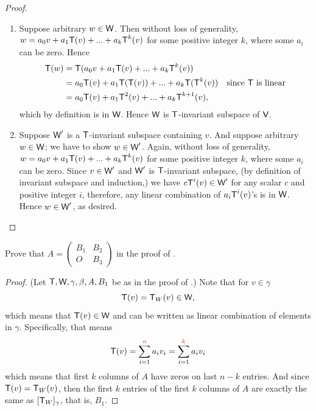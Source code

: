 \begin{proof} \ 

\begin{enumerate}
\item Suppose arbitrary \(w \in \textsf{W}\).
Then without loss of generality, \(w = a_0 v + a_1 \textsf{T}(v) + ... + a_k \textsf{T}^k(v)\) for some positive integer \(k\), where some \(a_i\) can be zero.
Hence
\begin{align*}
    \textsf{T}(w) & = \textsf{T}(a_0 v + a_1 \textsf{T}(v) + ... + a_k \textsf{T}^k(v)) \\
          & = a_0 \textsf{T}(v) + a_1 \textsf{T}(\textsf{T}(v)) + ... + a_k \textsf{T}(\textsf{T}^k(v)) & \text{since \(\textsf{T}\) is linear} \\
          & = a_0 \textsf{T}(v) + a_1 \textsf{T}^2(v) + ... + a_k \textsf{T}^{k + 1}(v),
\end{align*}
which by definition is in \(\textsf{W}\).
Hence \(\textsf{W}\) is \(\textsf{T}\)-invariant subspace of \(\textsf{V}\).

\item Suppose \(\textsf{W}'\) is a \(\textsf{T}\)-invariant subspace containing \(v\).
And suppose arbitrary \(w \in \textsf{W}\); we have to show \(w \in \textsf{W}'\).
Again, without loss of generality, \(w = a_0 v + a_1 \textsf{T}(v) + ... + a_k \textsf{T}^k(v)\) for some positive integer \(k\), where some \(a_i\) can be zero.
Since \(v \in \textsf{W}'\) and \(\textsf{W}'\) is \(\textsf{T}\)-invariant subspace, (by definition of invariant subspace and induction,) we have \(c \textsf{T}^i(v) \in \textsf{W}'\) for any scalar \(c\) and positive integer \(i\), therefore, any linear combination of \(a_i \textsf{T}^i(v)\)'s is in \(\textsf{W}\).
Hence \(w \in \textsf{W}'\), as desired.
\end{enumerate}
\end{proof}

\begin{exercise} \label{exercise 5.4.12}
Prove that \(A = \begin{pmatrix} B_1 & B_2 \\ O & B_3 \end{pmatrix}\) in the proof of .
\end{exercise}

\begin{proof}
(Let \(\textsf{T}, \textsf{W}, \gamma, \beta, A, B_1\) be as in the proof of .)
Note that for \(v \in \gamma\)
\[
    \textsf{T}(v) = \textsf{T}_W(v) \in \textsf{W},
\]
which means that \(\textsf{T}(v) \in \textsf{W}\) and can be written as linear combination of elements in \(\gamma\).
Specifically, that means
\[
    \T(v) = \sum_{i = 1}^{\RED{n}} a_i v_i = \sum_{i=1}^{\RED{k}} a_i v_i
\]
which means that first \(k\) columns of \(A\) have zeros on last \(n - k\) entries.
And since \(\textsf{T}(v) = \textsf{T}_W(v)\), then the first \(k\) entries of the first \(k\) columns of \(A\) are exactly the same as \([\textsf{T}_W]_{\gamma}\), that is, \(B_1\).
\end{proof}

